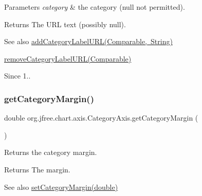 \begin{DoxyParams}{Parameters}
{\em category} & the category ({\ttfamily null} not permitted).\\
\hline
\end{DoxyParams}
\begin{DoxyReturn}{Returns}
The U\+RL text (possibly {\ttfamily null}).
\end{DoxyReturn}
\begin{DoxySeeAlso}{See also}
\mbox{\hyperlink{classorg_1_1jfree_1_1chart_1_1axis_1_1_category_axis_a305f59a6b2cd0512e01e4b08de21d36b}{add\+Category\+Label\+U\+R\+L(\+Comparable, String)}} 

\mbox{\hyperlink{classorg_1_1jfree_1_1chart_1_1axis_1_1_category_axis_a37bd2f2448d6ba0903b8b4d0ee98adf4}{remove\+Category\+Label\+U\+R\+L(\+Comparable)}}
\end{DoxySeeAlso}
\begin{DoxySince}{Since}
1.. 
\end{DoxySince}
\mbox{\label{classorg_1_1jfree_1_1chart_1_1axis_1_1_category_axis_a7f3b48c2323a993c49433577000f4daa}} 
\subsubsection{\texorpdfstring{get\+Category\+Margin()}{getCategoryMargin()}}
{\footnotesize\ttfamily double org.\+jfree.\+chart.\+axis.\+Category\+Axis.\+get\+Category\+Margin (\begin{DoxyParamCaption}{ }\end{DoxyParamCaption})}

Returns the category margin.

\begin{DoxyReturn}{Returns}
The margin.
\end{DoxyReturn}
\begin{DoxySeeAlso}{See also}
\mbox{\hyperlink{classorg_1_1jfree_1_1chart_1_1axis_1_1_category_axis_ae0b9ff86039cece69e084ba53823f7d7}{set\+Category\+Margin(double)}} 
\end{DoxySeeAlso}
\mbox{\label{classorg_1_1jfree_1_1chart_1_1axis_1_1_category_axis_a36f926e006732155c6447adc813765cd}} 

